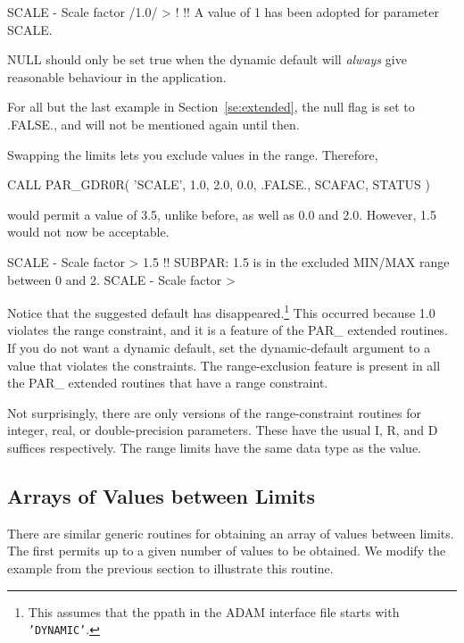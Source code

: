 \documentclass[twoside,11pt,nolof]{starlink}
\begin{document}
\begin{terminalv}
SCALE - Scale factor /1.0/ > !
!! A value of 1 has been adopted for parameter SCALE.
\end{terminalv}

NULL should only be set true when the dynamic default will \emph{always\/} give
reasonable behaviour in the application.

For all but the last example in Section~\ref{se:extended}, the null flag
is set to .FALSE., and will not be mentioned again until then.

Swapping the limits lets you exclude values in the range.  Therefore,

\begin{terminalv}
      CALL PAR_GDR0R( 'SCALE', 1.0, 2.0, 0.0, .FALSE., SCAFAC, STATUS )
\end{terminalv}

would permit a value of 3.5, unlike before, as well as 0.0 and 2.0.
However, 1.5 would not now be acceptable.

\begin{terminalv}
SCALE - Scale factor > 1.5
!! SUBPAR: 1.5 is in the excluded MIN/MAX range between 0 and 2.
SCALE - Scale factor >
\end{terminalv}

Notice that the suggested default has disappeared.\footnote{This assumes
that the ppath in the ADAM interface file starts with \texttt{'DYNAMIC'}.}
This occurred because 1.0 violates the range constraint, and it is a
feature of the PAR\_ extended routines.  If you do not want a dynamic
default, set the dynamic-default argument to a value that violates the
constraints.  The range-exclusion feature is present in all the PAR\_
extended routines that have a range constraint.

Not surprisingly, there are only versions of the range-constraint
routines for integer, real, or double-precision parameters.   These have
the usual I, R, and D suffices respectively.  The range limits have the
same data type as the value.

\subsection{Arrays of Values between Limits}
\label{se:avl}

There are similar generic routines for obtaining an array of values
between limits.  The first permits up to a given number of values to be
obtained.  We modify the example from the previous section to illustrate
this routine.
\end{document}
